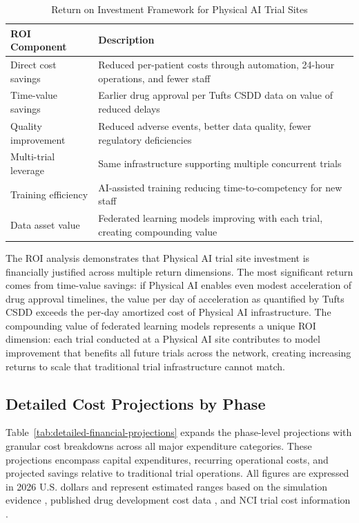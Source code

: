 \begin{table}[H]
\centering
\caption{Return on Investment Framework for Physical AI Trial Sites}
\label{tab:roi-analysis}
\small
\begin{tabularx}{\textwidth}{l X}
\toprule
\textbf{ROI Component} & \textbf{Description} \\
\midrule
Direct cost savings & Reduced per-patient costs through automation, 24-hour operations, and fewer staff \\
Time-value savings & Earlier drug approval per Tufts CSDD data on value of reduced delays \\
Quality improvement & Reduced adverse events, better data quality, fewer regulatory deficiencies \\
Multi-trial leverage & Same infrastructure supporting multiple concurrent trials \\
Training efficiency & AI-assisted training reducing time-to-competency for new staff \\
Data asset value & Federated learning models improving with each trial, creating compounding value \\
\bottomrule
\end{tabularx}
\end{table}

The ROI analysis demonstrates that Physical AI trial site investment is
financially justified across multiple return dimensions. The most significant
return comes from time-value savings: if Physical AI enables even modest
acceleration of drug approval timelines, the value per day of acceleration as
quantified by Tufts CSDD \cite{tufts-delay} exceeds the per-day amortized
cost of Physical AI infrastructure. The compounding value of federated learning
models represents a unique ROI dimension: each trial conducted at a Physical AI
site contributes to model improvement that benefits all future trials across
the network, creating increasing returns to scale that traditional trial
infrastructure cannot match.

\subsection{Detailed Cost Projections by Phase}
\label{subsec:financial-detailed-projections}

Table~\ref{tab:detailed-financial-projections} expands the phase-level
projections with granular cost breakdowns across all major expenditure
categories. These projections encompass capital expenditures, recurring
operational costs, and projected savings relative to traditional trial
operations. All figures are expressed in 2026 U.S. dollars and represent
estimated ranges based on the simulation evidence
\cite{patient-journey-paper, site-docs}, published drug development cost data
\cite{tufts-delay}, and NCI trial cost information \cite{nci-trials-paying}.


